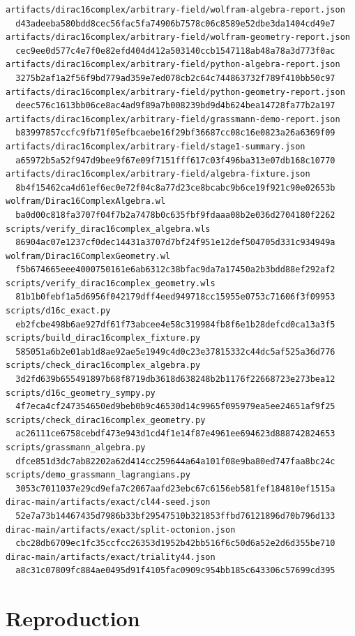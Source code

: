 \documentclass[11pt]{article}
\begin{document}
\begin{Verbatim}[fontsize=\small]
artifacts/dirac16complex/arbitrary-field/wolfram-algebra-report.json
  d43adeeba580bdd8cec56fac5fa74906b7578c06c8589e52dbe3da1404cd49e7
artifacts/dirac16complex/arbitrary-field/wolfram-geometry-report.json
  cec9ee0d577c4e7f0e82efd404d412a503140ccb1547118ab48a78a3d773f0ac
artifacts/dirac16complex/arbitrary-field/python-algebra-report.json
  3275b2af1a2f56f9bd779ad359e7ed078cb2c64c744863732f789f410bb50c97
artifacts/dirac16complex/arbitrary-field/python-geometry-report.json
  deec576c1613bb06ce8ac4ad9f89a7b008239bd9d4b624bea14728fa77b2a197
artifacts/dirac16complex/arbitrary-field/grassmann-demo-report.json
  b83997857ccfc9fb71f05efbcaebe16f29bf36687cc08c16e0823a26a6369f09
artifacts/dirac16complex/arbitrary-field/stage1-summary.json
  a65972b5a52f947d9bee9f67e09f7151fff617c03f496ba313e07db168c10770
artifacts/dirac16complex/arbitrary-field/algebra-fixture.json
  8b4f15462ca4d61ef6ec0e72f04c8a77d23ce8bcabc9b6ce19f921c90e02653b
wolfram/Dirac16ComplexAlgebra.wl
  ba0d00c818fa3707f04f7b2a7478b0c635fbf9fdaaa08b2e036d2704180f2262
scripts/verify_dirac16complex_algebra.wls
  86904ac07e1237cf0dec14431a3707d7bf24f951e12def504705d331c934949a
wolfram/Dirac16ComplexGeometry.wl
  f5b674665eee4000750161e6ab6312c38bfac9da7a17450a2b3bdd88ef292af2
scripts/verify_dirac16complex_geometry.wls
  81b1b0febf1a5d6956f042179dff4eed949718cc15955e0753c71606f3f09953
scripts/d16c_exact.py
  eb2fcbe498b6ae927df61f73abcee4e58c319984fb8f6e1b28defcd0ca13a3f5
scripts/build_dirac16complex_fixture.py
  585051a6b2e01ab1d8ae92ae5e1949c4d0c23e37815332c44dc5af525a36d776
scripts/check_dirac16complex_algebra.py
  3d2fd639b655491897b68f8719db3618d638248b2b1176f22668723e273bea12
scripts/d16c_geometry_sympy.py
  4f7eca4cf247354650ed9beb0b9c46530d14c9965f095979ea5ee24651af9f25
scripts/check_dirac16complex_geometry.py
  ac26111ce6758cebdf473e943d1cd4f1e14f87e4961ee694623d888742824653
scripts/grassmann_algebra.py
  dfce851d3dc7ab82202a62d414cc259644a64a101f08e9ba80ed747faa8bc24c
scripts/demo_grassmann_lagrangians.py
  3053c7011037e29cd9efa7c2067aafd23ebc67c6156eb581fef184810ef1515a
dirac-main/artifacts/exact/cl44-seed.json
  52e7a73b14467435d7986b33bf29547510b321853ffbd76121896d70b796d133
dirac-main/artifacts/exact/split-octonion.json
  cbc28db6709ec1fc35ccfcc26353d1952b42bb516f6c50d6a52e2d6d355be710
dirac-main/artifacts/exact/triality44.json
  a8c31c07809fc884ae0495d91f4105fac0909c954bb185c643306c57699cd395
\end{Verbatim}

\section{Reproduction}
\end{document}
